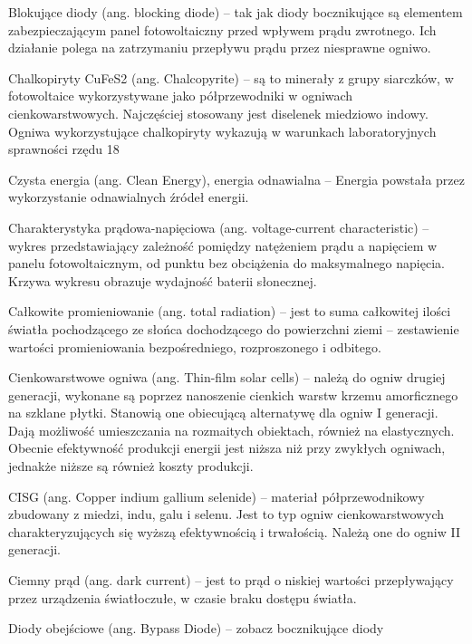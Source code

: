 \documentclass[12pt,a4paper]{article}
\begin{document}
Blokujące diody (ang. blocking diode) – tak jak diody bocznikujące są elementem zabezpieczającym panel fotowoltaiczny przed wpływem prądu zwrotnego. Ich działanie polega na zatrzymaniu przepływu prądu przez niesprawne ogniwo.


Chalkopiryty CuFeS2 (ang. Chalcopyrite) – są to minerały z grupy siarczków, w fotowoltaice wykorzystywane jako półprzewodniki w ogniwach cienkowarstwowych. Najczęściej stosowany jest diselenek miedziowo indowy. Ogniwa wykorzystujące chalkopiryty wykazują w warunkach laboratoryjnych sprawności rzędu 18%

Czysta energia (ang. Clean Energy), energia odnawialna – Energia powstała przez wykorzystanie odnawialnych źródeł energii.

Charakterystyka prądowa-napięciowa (ang. voltage-current characteristic) – wykres przedstawiający zależność pomiędzy natężeniem prądu a napięciem w panelu fotowoltaicznym, od punktu bez obciążenia do maksymalnego napięcia. Krzywa wykresu obrazuje wydajność baterii słonecznej.

Całkowite promieniowanie (ang. total radiation) – jest to suma całkowitej ilości światła pochodzącego ze słońca dochodzącego do powierzchni ziemi – zestawienie wartości promieniowania bezpośredniego, rozproszonego i odbitego.

Cienkowarstwowe ogniwa (ang. Thin-film solar cells) – należą do ogniw drugiej generacji, wykonane są poprzez nanoszenie cienkich warstw krzemu amorficznego na szklane płytki. Stanowią one obiecującą alternatywę dla ogniw I generacji. Dają możliwość umieszczania na rozmaitych obiektach, również na elastycznych. Obecnie efektywność produkcji energii jest niższa niż przy zwykłych ogniwach, jednakże niższe są również koszty produkcji.

CISG (ang. Copper indium gallium selenide) – materiał półprzewodnikowy zbudowany z miedzi, indu, galu i selenu. Jest to typ ogniw cienkowarstwowych charakteryzujących się wyższą efektywnością i trwałością. Należą one do ogniw II generacji.

Ciemny prąd (ang. dark current) – jest to prąd o niskiej wartości przepływający przez urządzenia światłoczułe, w czasie braku dostępu światła.


Diody obejściowe (ang. Bypass Diode) – zobacz bocznikujące diody
\end{document}
